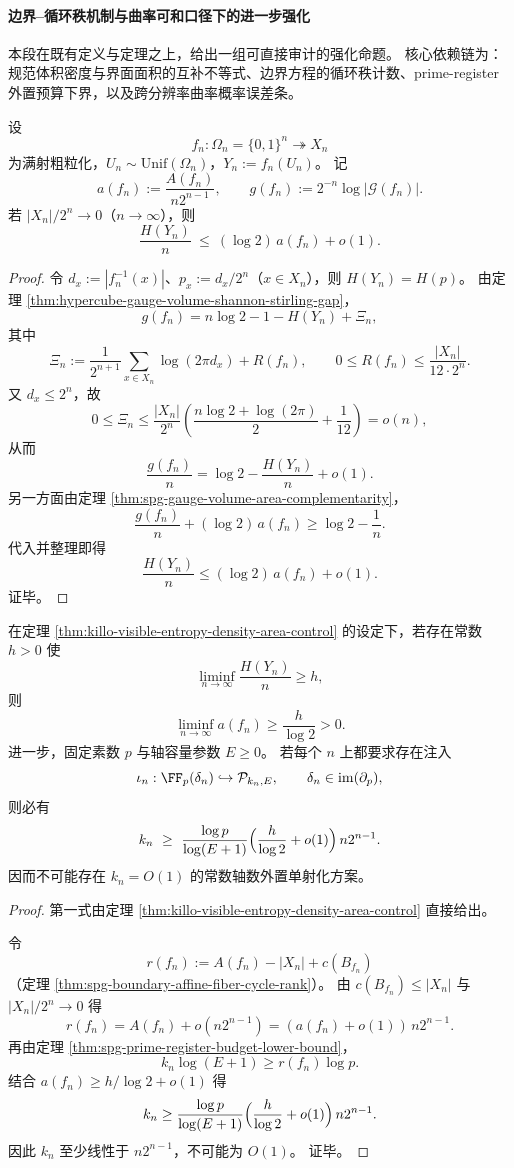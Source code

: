 \paragraph{边界--循环秩机制与曲率可和口径下的进一步强化}
本段在既有定义与定理之上，给出一组可直接审计的强化命题。
核心依赖链为：规范体积密度与界面面积的互补不等式、边界方程的循环秩计数、prime-register 外置预算下界，以及跨分辨率曲率概率误差条。

\begin{theorem}[可见熵密度受面积密度控制]\label{thm:killo-visible-entropy-density-area-control}
设
\[
f_n:\Omega_n=\{0,1\}^n\twoheadrightarrow X_n
\]
为满射粗粒化，\(U_n\sim\mathrm{Unif}(\Omega_n)\)，\(Y_n:=f_n(U_n)\)。
记
\[
a(f_n):=\frac{A(f_n)}{n2^{n-1}},
\qquad
g(f_n):=2^{-n}\log|\mathcal G(f_n)|.
\]
若 \(|X_n|/2^n\to 0\)（\(n\to\infty\)），则
\[
\frac{H(Y_n)}{n}\ \le\ (\log 2)\,a(f_n)+o(1).
\]
\end{theorem}
\begin{proof}
令 \(d_x:=|f_n^{-1}(x)|\)、\(p_x:=d_x/2^n\)（\(x\in X_n\)），则 \(H(Y_n)=H(p)\)。
由定理 \ref{thm:hypercube-gauge-volume-shannon-stirling-gap}，
\[
g(f_n)=n\log 2-1-H(Y_n)+\Xi_n,
\]
其中
\[
\Xi_n:=\frac1{2^{n+1}}\sum_{x\in X_n}\log(2\pi d_x)+R(f_n),\qquad
0\le R(f_n)\le \frac{|X_n|}{12\cdot 2^n}.
\]
又 \(d_x\le 2^n\)，故
\[
0\le \Xi_n
\le
\frac{|X_n|}{2^n}\!\left(\frac{n\log 2+\log(2\pi)}{2}+\frac1{12}\right)
=o(n),
\]
从而
\[
\frac{g(f_n)}{n}=\log 2-\frac{H(Y_n)}{n}+o(1).
\]
另一方面由定理 \ref{thm:spg-gauge-volume-area-complementarity}，
\[
\frac{g(f_n)}{n}+(\log 2)\,a(f_n)\ge \log 2-\frac1n.
\]
代入并整理即得
\[
\frac{H(Y_n)}{n}\le (\log 2)\,a(f_n)+o(1).
\]
证毕。
\end{proof}

\begin{corollary}[正信息率排斥常数外置记忆]\label{cor:killo-positive-entropy-rate-excludes-constant-external-memory}
在定理 \ref{thm:killo-visible-entropy-density-area-control} 的设定下，若存在常数 \(h>0\) 使
\[
\liminf_{n\to\infty}\frac{H(Y_n)}{n}\ge h,
\]
则
\[
\liminf_{n\to\infty}a(f_n)\ge \frac{h}{\log 2}>0.
\]
进一步，固定素数 \(p\) 与轴容量参数 \(E\ge 0\)。
若每个 \(n\) 上都要求存在注入
\[
\iota_n:\FF_p(\delta_n)\hookrightarrow \mathcal P_{k_n,E},
\qquad
\delta_n\in\mathrm{im}(\partial_p),
\]
则必有
\[
k_n\ \ge\ \frac{\log p}{\log(E+1)}
\Bigl(\frac{h}{\log 2}+o(1)\Bigr)\,n2^{n-1}.
\]
因而不可能存在 \(k_n=O(1)\) 的常数轴数外置单射化方案。
\end{corollary}
\begin{proof}
第一式由定理 \ref{thm:killo-visible-entropy-density-area-control} 直接给出。

令
\[
r(f_n):=A(f_n)-|X_n|+c(B_{f_n})
\]
（定理 \ref{thm:spg-boundary-affine-fiber-cycle-rank}）。
由 \(c(B_{f_n})\le |X_n|\) 与 \(|X_n|/2^n\to 0\) 得
\[
r(f_n)=A(f_n)+o(n2^{n-1})=(a(f_n)+o(1))\,n2^{n-1}.
\]
再由定理 \ref{thm:spg-prime-register-budget-lower-bound}，
\[
k_n\log(E+1)\ge r(f_n)\log p.
\]
结合 \(a(f_n)\ge h/\log 2+o(1)\) 得
\[
k_n\ge
\frac{\log p}{\log(E+1)}
\Bigl(\frac{h}{\log 2}+o(1)\Bigr)\,n2^{n-1}.
\]
因此 \(k_n\) 至少线性于 \(n2^{n-1}\)，不可能为 \(O(1)\)。
证毕。
\end{proof}

